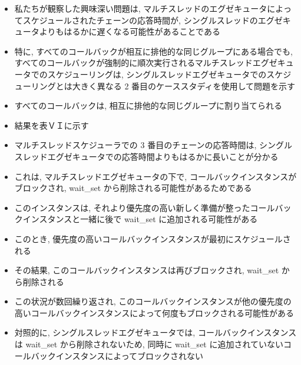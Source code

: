 \begin{frame}{}
    \begin{itemize}
        \item 私たちが観察した興味深い問題は, マルチスレッドのエグゼキュータによってスケジュールされたチェーンの応答時間が, シングルスレッドのエグゼキュータよりもはるかに遅くなる可能性があることである
\item 特に, すべてのコールバックが相互に排他的な同じグループにある場合でも, すべてのコールバックが強制的に順次実行されるマルチスレッドエグゼキュータでのスケジューリングは, シングルスレッドエグゼキュータでのスケジューリングとは大きく異なる 2 番目のケーススタディを使用して問題を示す
\item すべてのコールバックは, 相互に排他的な同じグループに割り当てられる
    \end{itemize}
\end{frame}

\begin{frame}{}
    \begin{itemize}
        \item 結果を表ＶＩに示す
\item マルチスレッドスケジューラでの 3 番目のチェーンの応答時間は, シングルスレッドエグゼキュータでの応答時間よりもはるかに長いことが分かる
\item これは, マルチスレッドエグゼキュータの下で, コールバックインスタンスがブロックされ, wait\_set から削除される可能性があるためである
\item このインスタンスは, それより優先度の高い新しく準備が整ったコールバックインスタンスと一緒に後で wait\_set に追加される可能性がある
\item このとき, 優先度の高いコールバックインスタンスが最初にスケジュールされる
\item その結果, このコールバックインスタンスは再びブロックされ, wait\_set から削除される
\item この状況が数回繰り返され, このコールバックインスタンスが他の優先度の高いコールバックインスタンスによって何度もブロックされる可能性がある
\item 対照的に, シングルスレッドエグゼキュータでは, コールバックインスタンスは wait\_set から削除されないため, 同時に wait\_set に追加されていないコールバックインスタンスによってブロックされない
    \end{itemize}
\end{frame}

